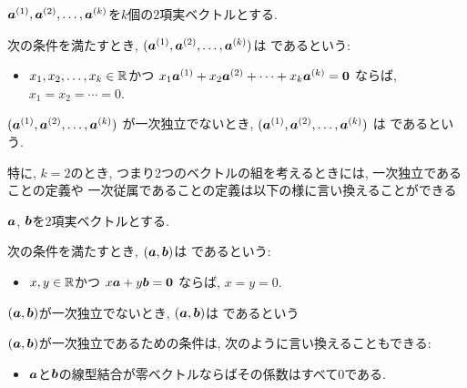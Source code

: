 \begin{definition}
  \label{def:linindep}
  $\boldsymbol{a}^{(1)}, \boldsymbol{a}^{(2)},\ldots, \boldsymbol{a}^{(k)}$を$k$個の$2$項実ベクトルとする.
  
  次の条件を満たすとき,
  $(\boldsymbol{a}^{(1)}, \boldsymbol{a}^{(2)},\ldots, \boldsymbol{a}^{(k)})$は
  であるという:
  \begin{itemize}
  \item
    $x_1,x_2,\ldots, x_k\in\mathbb{R}$かつ
    $x_1\boldsymbol{a}^{(1)}+x_2\boldsymbol{a}^{(2)}+\cdots+x_k\boldsymbol{a}^{(k)}=\boldsymbol{0}$
    ならば, $x_1=x_2=\cdots=0$.
  \end{itemize}

  $(\boldsymbol{a}^{(1)}, \boldsymbol{a}^{(2)},\ldots, \boldsymbol{a}^{(k)})$
  が一次独立でないとき,
  $(\boldsymbol{a}^{(1)}, \boldsymbol{a}^{(2)},\ldots, \boldsymbol{a}^{(k)})$
  は
  であるという.
\end{definition}


特に, $k=2$のとき, つまり2つのベクトルの組を考えるときには,
一次独立であることの定義や
一次従属であることの定義は以下の様に言い換えることができる
\begin{definition}
  $\boldsymbol{a}$, $\boldsymbol{b}$を$2$項実ベクトルとする.
  
  次の条件を満たすとき,
  $(\boldsymbol{a},\boldsymbol{b})$は
  であるという:
  \begin{itemize}
  \item
    $x,y\in\mathbb{R}$かつ
    $x\boldsymbol{a}+y\boldsymbol{b}=\boldsymbol{0}$
    ならば, $x=y=0$.
  \end{itemize}

  $(\boldsymbol{a},\boldsymbol{b})$が一次独立でないとき,
  $(\boldsymbol{a},\boldsymbol{b})$は
  であるという
\end{definition}
\begin{remark}
  $(\boldsymbol{a},\boldsymbol{b})$が一次独立であるための条件は,
  次のように言い換えることもできる:
  \begin{itemize}
  \item
    $\boldsymbol{a}$と$\boldsymbol{b}$の線型結合が零ベクトルならばその係数はすべて$0$である.
  \end{itemize}
\end{remark}

